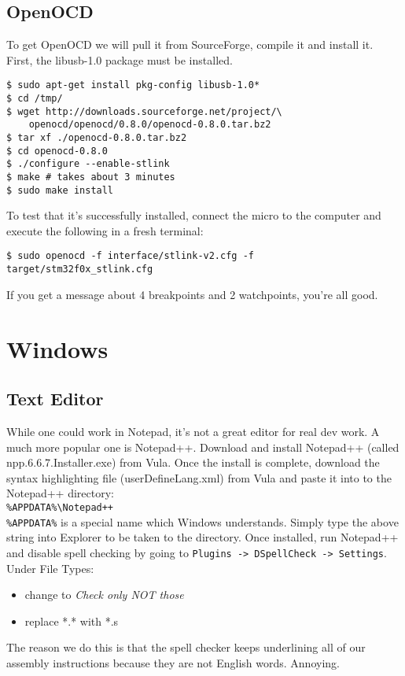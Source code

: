 \subsection{OpenOCD}
To get OpenOCD we will pull it from SourceForge, compile it and install it. First, the libusb-1.0 package must be installed.
\begin{lstlisting}[style=BashStyle]
$ sudo apt-get install pkg-config libusb-1.0*
$ cd /tmp/
$ wget http://downloads.sourceforge.net/project/\
    openocd/openocd/0.8.0/openocd-0.8.0.tar.bz2
$ tar xf ./openocd-0.8.0.tar.bz2 
$ cd openocd-0.8.0
$ ./configure --enable-stlink
$ make # takes about 3 minutes
$ sudo make install
\end{lstlisting}
To test that it's successfully installed, connect the micro to the computer and execute the following in a fresh terminal:
\begin{lstlisting}[style=BashStyle]
$ sudo openocd -f interface/stlink-v2.cfg -f target/stm32f0x_stlink.cfg
\end{lstlisting}
If you get a message about 4 breakpoints and 2 watchpoints, you're all good.

\section{Windows}
\subsection{Text Editor}
While one could work in Notepad, it's not a great editor for real dev work. A much more popular one is Notepad++. Download and install Notepad++ (called npp.6.6.7.Installer.exe) from Vula. 
Once the install is complete, download the syntax highlighting file (userDefineLang.xml) from Vula and paste it into to the Notepad++ directory: \\
\verb;%APPDATA%\Notepad++;\\
\verb+%APPDATA%+ is a special name which Windows understands. Simply type the above string into Explorer to be taken to the directory. 
Once installed, run Notepad++ and disable spell checking by going to \verb+Plugins -> DSpellCheck -> Settings+. 
Under File Types:
\begin{itemize}
\item change to \textit{Check only NOT those}
\item replace   *.*   with   *.s
\end{itemize}
The reason we do this is that the spell checker keeps underlining all of our assembly instructions because they are not English words. Annoying.


